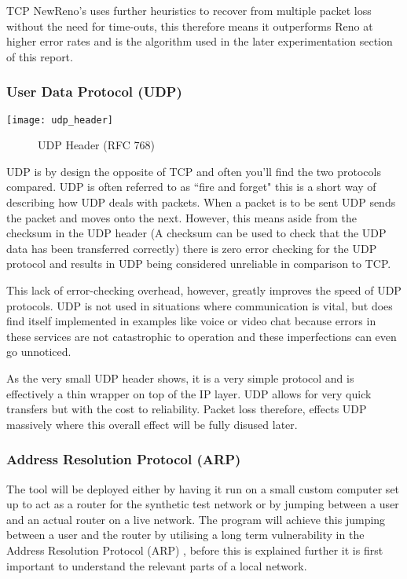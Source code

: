 TCP NewReno's uses further heuristics to recover from multiple packet loss without the need for time-outs, this therefore means it outperforms Reno at higher error rates and is the algorithm used in the later experimentation section of this report.

\subsubsection{User Data Protocol (UDP)}
\begin{center}
	\texttt{[image: udp\_header]}
	\begin{figure}[h]
		\caption{UDP Header (RFC 768)}
	\end{figure}		
\end{center}

UDP is by design the opposite of TCP and often you'll find the two protocols compared. UDP is often referred to as ``fire and forget" \citep{kempf2011thoughts} this is a short way of describing how UDP deals with packets. When a packet is to be sent UDP sends the packet and moves onto the next. However, this means aside from the checksum in the UDP header (A checksum can be used to check that the UDP data has been transferred correctly) there is zero error checking for the UDP protocol and results in UDP being considered unreliable in comparison to TCP. 

This lack of error-checking overhead, however, greatly improves the speed of UDP protocols. UDP is not used in situations where communication is vital, but does find itself implemented in examples like voice or video chat because errors in these services are not catastrophic to operation and these imperfections can even go unnoticed.

As the very small UDP header shows, it is a very simple protocol and is effectively a thin wrapper on top of the IP layer. UDP allows for very quick transfers but with the cost to reliability. Packet loss therefore, effects UDP massively where this overall effect will be fully disused later.

\clearpage
\subsubsection{Address Resolution Protocol (ARP)}
The tool will be deployed either by having it run on a small custom computer set up to act as a router for the synthetic test network or by jumping between a user and an actual router on a live network. The program will achieve this jumping between a user and the router by utilising a long term vulnerability in the Address Resolution Protocol (ARP) \citep{arp2001}, before this is explained further it is first important to understand the relevant parts of a local network.

